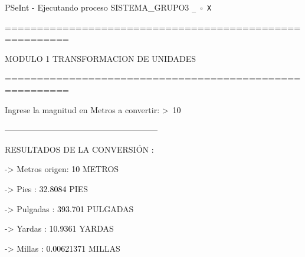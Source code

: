 \documentclass[12pt,a4paper]{article}
\newcommand{\consola}[1]{\noindent\textcolor{pseString}{#1}}
\newcommand{\entrada}[1]{\textcolor{black}{#1}}
\newenvironment{PSeIntWindow}{%
	\begin{tcolorbox}[
		breakable,
		enhanced,
		colback=white,
		colframe=black!60,
		boxrule=0.5pt,
		arc=1mm,
		left=0mm,
		right=0mm,
		top=0mm,
		bottom=2mm,
		width=\textwidth
		]
	}{%
	\end{tcolorbox}
}
\newcommand{\BarraPSeInt}{%
	\colorbox{gray!20}{%
		\parbox{\dimexpr\textwidth-2\fboxsep\relax}{%
			\small
			\textcolor{pseString}{\faPlayCircle}
			\hspace{0.3em}
			PSeInt - Ejecutando proceso SISTEMA\_GRUPO3
			\hfill
			\texttt{\_ \hspace{0.5em} \(\square\) \hspace{0.5em} X}
		}
	}
}
\begin{document}
\begin{PSeIntWindow}
	
	\BarraPSeInt
	
	\vspace{0.2cm}
	
	\ttfamily
	\small
	
	\consola{========================================================}\par
	
	\begin{center}
		\textcolor{pseString}{MODULO 1 \hspace{1cm} TRANSFORMACION DE UNIDADES}
	\end{center}
	
	\consola{========================================================}\par
	
	\vspace{0.4cm}
	
	\consola{Ingrese la magnitud en Metros a convertir: \textgreater\ }\entrada{10}\par
	
	\vspace{0.4cm}
	
	\consola{--------------------------------------------------------}\par
	
	\vspace{0.2cm}
	
	\consola{RESULTADOS DE LA CONVERSIÓN :}\par
	
	\vspace{0.2cm}
	
	\consola{\hspace*{0.5cm}-> Metros origen: }\entrada{10}\consola{ METROS}\par
	
	\consola{\hspace*{0.5cm}-> Pies : }\entrada{32.8084}\consola{ PIES}\par
	
	\consola{\hspace*{0.5cm}-> Pulgadas : }\entrada{393.701}\consola{ PULGADAS}\par
	
	\consola{\hspace*{0.5cm}-> Yardas : }\entrada{10.9361}\consola{ YARDAS}\par
	
	\consola{\hspace*{0.5cm}-> Millas : }\entrada{0.00621371}\consola{ MILLAS}\par
	

\end{PSeIntWindow}
\end{document}
